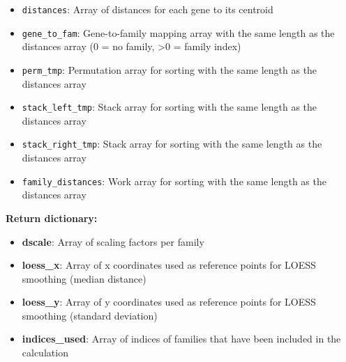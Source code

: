 \documentclass[11pt]{article}
\begin{document}
\begin{enumerate}
\begin{enumerate}
	      	      \begin{itemize}
	      	      	\item \texttt{distances}: Array of distances for each gene to its centroid
	      	      	      
	      	      	\item \texttt{gene\_to\_fam}: Gene-to-family mapping array with the same
	      	      	      length as the distances array (0 = no family, \textgreater 0 = family
	      	      	      index)
	      	      	      
	      	      	\item \texttt{perm\_tmp}: Permutation array for sorting with the same
	      	      	      length as the distances array
	      	      	      
	      	      	\item \texttt{stack\_left\_tmp}: Stack array for sorting with the same
	      	      	      length as the distances array
	      	      	      
	      	      	\item \texttt{stack\_right\_tmp}: Stack array for sorting with the same
	      	      	      length as the distances array
	      	      	      
	      	      	\item \texttt{family\_distances}: Work array for sorting with the same
	      	      	      length as the distances array
	      	      \end{itemize}
	      	      
	      	      \textbf{Return dictionary:}
	      	      \begin{itemize}
	      	      	\item \textbf{dscale}: Array of scaling factors per family
	      	      	      
	      	      	\item \textbf{loess\_x}: Array of x coordinates used as reference points
	      	      	      for LOESS smoothing (median distance)
	      	      	      
	      	      	\item \textbf{loess\_y}: Array of y coordinates used as reference points
	      	      	      for LOESS smoothing (standard deviation)
	      	      	      
	      	      	\item \textbf{indices\_used}: Array of indices of families that have
	      	      	      been included in the calculation
	      	      	      

\end{itemize}
\end{enumerate}
\end{enumerate}
\end{document}
